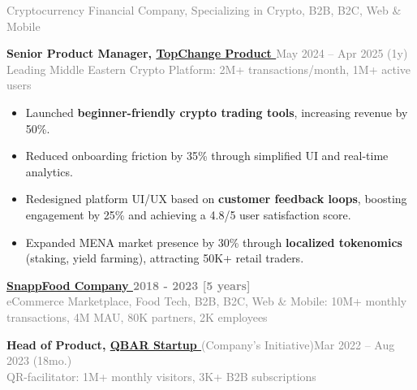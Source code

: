 \documentclass[a4paper,10pt]{article}
\newcommand{\majorposition}[1]{{\hspace{0pt}\Large\bfseries #1}\vspace{0.1em}}
\newcommand{\position}[1]{\Large\bfseries #1}\vspace{0.1em}
\newcommand{\bulletitem}[1]{\item #1\vspace{0.1em}}
\newcommand{\graytext}[1]{\textcolor{grey}{#1}} %
\begin{document}
{\small{\graytext{Cryptocurrency Financial Company, Specializing in Crypto, B2B, B2C, Web \& Mobile}}
\vspace{2pt}
\begin{adjustwidth}{0.5cm}{0cm}
{{\position{Senior Product Manager, }\large{\href{https://topchange.net}{TopChange Product \faExternalLink{} }}}\hfill \large\graytext{May 2024 – Apr 2025 (1y)}}
\\
{\small\graytext{Leading Middle Eastern Crypto Platform: 2M+ transactions/month, 1M+ active users}}
\begin{adjustwidth}{0.5cm}{0cm}
\normalsize
\begin{itemize}
  \bulletitem{Launched \textbf{beginner-friendly crypto trading tools}, increasing revenue by 50\%.}
  \bulletitem{Reduced onboarding friction by 35\% through simplified UI and real-time analytics.}
  \bulletitem{Redesigned platform UI/UX based on \textbf{customer feedback loops}, boosting engagement by 25\% and achieving a 4.8/5 user satisfaction score.}
  \bulletitem{Expanded MENA market presence by 30\% through \textbf{localized tokenomics} (staking, yield farming), attracting 50K+ retail traders.}
\end{itemize}
\end{adjustwidth}
\end{adjustwidth}
\vspace{8pt}
{\majorposition{\href{https://snappfood.ir}{SnappFood Company \faExternalLink{}}} \hfill\Large{\textbf{\graytext{2018 - 2023 [5 years]}}}}\\
{\small{\graytext{eCommerce Marketplace, Food Tech, B2B, B2C, Web \& Mobile: 10M+ monthly transactions, 4M MAU, 80K partners, 2K employees}}}
\begin{adjustwidth}{0.5cm}{0cm}
{{\position{Head of Product, }\large{\href{https://qbar.ir/container}{QBAR Startup \faExternalLink{} }}}{\small{\graytext{(Company’s Initiative)}}}\hfill \large\graytext{Mar 2022 – Aug 2023 (18mo.)}}
\\
{\small\graytext{QR-facilitator: 1M+ monthly visitors, 3K+ B2B subscriptions}}
\begin{adjustwidth}{0.5cm}{0cm}

\end{adjustwidth}
\end{adjustwidth}}
\end{document}
